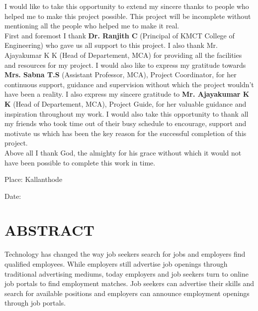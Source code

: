 \documentclass[a4paper,12pt]{report}
\begin{document}
\vspace*{20pt}

I would like to take this opportunity to extend my sincere thanks to people who helped me to make
this project possible. This project will be incomplete without mentioning all the people who helped
me to make it real.\\

\hspace{12pt} First and foremost I thank { \bf Dr. Ranjith C} (Principal of KMCT College of Engineering) who
gave us all support to this project. I also thank Mr. Ajayakumar K K (Head of Departement,
MCA) for providing all the facilities and resources for my project. I would also like to express my
gratitude towards { \bf Mrs. Sabna T.S } (Assistant Professor, MCA), Project Coordinator, for her
continuous support, guidance and supervision without which the project wouldn’t have been a
reality. I also express my sincere gratitude to { \bf  Mr. Ajayakumar K K } (Head of Departement,
MCA), Project
Guide, for her valuable guidance and inspiration throughout my work. I would also take this
opportunity to thank all my friends who took time out of their busy schedule to encourage, support
and motivate us which has been the key reason for the successful completion of this project.\\ 
 
Above all I thank God, the almighty for his grace without which it would not have been
possible to complete this work in time.	

\begin{center}\vspace*{40pt}
	Place: Kallanthode  \hspace*{335pt}
\end{center}

\begin{center}\vspace*{20pt}
	Date:   \hspace*{400pt}
\end{center}


\pagebreak



\section*{\centering \bf \large ABSTRACT}
\vspace*{20pt}
\par
\hspace*{12pt}Technology has changed the way job seekers search for jobs and employers
find qualified employees. While employers still advertise job openings through
traditional advertising mediums, today employers and job seekers turn to online
job portals to find employment matches. Job seekers can advertise their skills and
search for available positions and employers can announce employment openings
through job portals.\\
\end{document}
